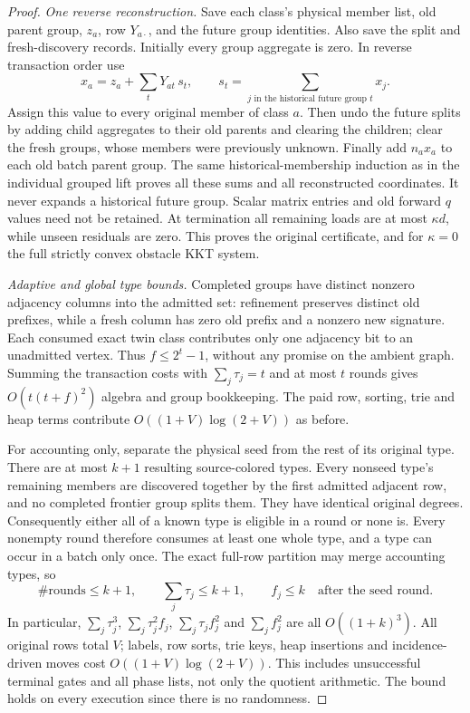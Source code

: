 \begin{proof}
\emph{One reverse reconstruction.}
Save each class's physical member list, old parent group, $z_a$, row
$Y_{a\cdot}$, and the future group identities. Also save the split and
fresh-discovery records. Initially every group aggregate is zero.
In reverse transaction order use
\[
 x_a=z_a+\sum_t Y_{at}\,s_t,
 \qquad s_t=\sum_{j\text{ in the historical future group }t}x_j.
\]
Assign this value to every original member of class $a$. Then undo the
future splits by adding child aggregates to their old parents and clearing
the children; clear the fresh groups, whose members were previously
unknown. Finally add $n_a x_a$ to each old batch parent group. The same
historical-membership induction as in the individual grouped lift proves
all these sums and all reconstructed coordinates. It never expands a
historical future group. Scalar matrix entries and old forward $q$ values
need not be retained. At termination all remaining loads are at most
$\kappa d$, while unseen residuals are zero. This proves the original
certificate, and for $\kappa=0$ the full strictly convex obstacle KKT system.

\emph{Adaptive and global type bounds.}
Completed groups have distinct nonzero adjacency columns into the admitted
set: refinement preserves distinct old prefixes, while a fresh column has
zero old prefix and a nonzero new signature. Each consumed exact twin
class contributes only one adjacency bit to an unadmitted vertex. Thus
$f\leq2^t-1$, without any promise on the ambient graph. Summing the
transaction costs with $\sum_j\tau_j=t$ and at most $t$ rounds gives
$O(t(t+f)^2)$ algebra and group bookkeeping. The paid row, sorting, trie
and heap terms contribute $O((1+V)\log(2+V))$ as before.

For accounting only, separate the physical seed from the rest of its
original type. There are at most $k+1$ resulting source-colored types.
Every nonseed type's remaining members are discovered together by the
first admitted adjacent row, and no completed frontier group splits them.
They have identical original degrees. Consequently either all of a known
type is eligible in a round or none is. Every nonempty round therefore
consumes at least one whole type, and a type can occur in a batch only
once. The exact full-row partition may merge accounting types, so
\[
 \#\text{rounds}\leq k+1,
 \qquad \sum_j\tau_j\leq k+1,
 \qquad f_j\leq k\quad\text{after the seed round}.
\]
In particular, $\sum_j\tau_j^3$, $\sum_j\tau_j^2f_j$,
$\sum_j\tau_jf_j^2$ and $\sum_jf_j^2$ are all $O((1+k)^3)$.
All original rows total $V$; labels, row sorts, trie keys, heap insertions
and incidence-driven moves cost $O((1+V)\log(2+V))$. This includes
unsuccessful terminal gates and all phase lists, not only the quotient
arithmetic. The bound holds on every execution since there is no randomness.


\end{proof}
